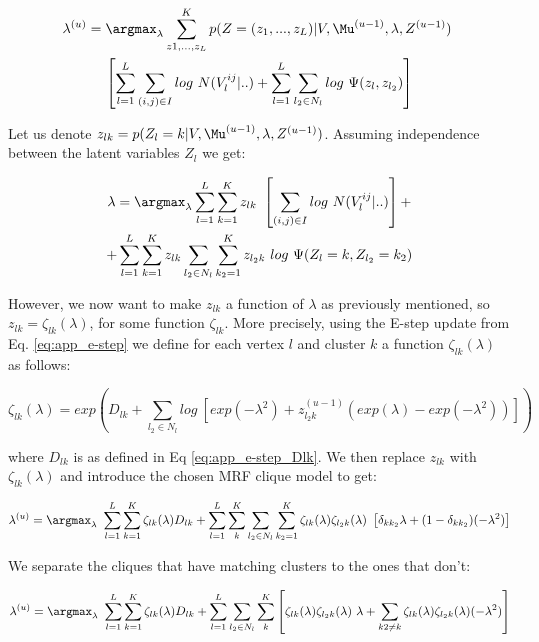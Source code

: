 \begin{multline}
\lambda^{(u)} = \argmax_{\lambda} \sum_{z1,\dots, z_L}^K p(Z = (z_1, ..., z_L) | V, \Mu^{(u-1)}, \lambda, Z^{(u-1)})\ \\ \left[ \sum_{l=1}^L \sum_{(i,j) \in I} log\ N(V_l^{ij} | ..) + \sum_{l = 1}^{L}\sum_{l_2 \in N_l} log\ \Psi (z_{l}, z_{l_2}) \right]
\end{multline}

Let us denote $z_{lk} = p(Z_l = k | V, \Mu^{(u-1)}, \lambda, Z^{(u-1)})$. Assuming independence between the latent variables $Z_l$ we get:

\begin{multline}
\lambda = \argmax_{\lambda} \sum_{l=1}^L \sum_{k=1}^K z_{lk}\ \left[ \sum_{(i,j) \in I} log\ N(V_l^{ij} | ..) \right] + \\ + \sum_{l = 1}^{L} \sum_{k=1}^K z_{lk} \sum_{l_2 \in N_l} \sum_{k_2 = 1}^K z_{l_2k}\ log\ \Psi (Z_{l} = k, Z_{l_2} = k_2)  
\end{multline}

However, we now want to make $z_{lk}$ a function of $\lambda$ as previously mentioned, so $z_{lk}=\zeta_{lk}(\lambda)$, for some function $\zeta_{lk}$. More precisely, using the E-step update from Eq. \ref{eq:app_e-step} we define for each vertex $l$ and cluster $k$ a function $\zeta_{lk}(\lambda)$ as follows:

\begin{equation}
\zeta_{lk}(\lambda) = exp \left( D_{lk} +   \sum_{l_2 \in N_l} log\ \left[ exp(-\lambda^2) + z_{l_2k}^{(u-1)} (exp(\lambda) - exp(-\lambda^2)) \right] \right)
\end{equation}

where $D_{lk}$ is as defined in Eq \ref{eq:app_e-step_Dlk}. We then replace $z_{lk}$ with $\zeta_{lk}(\lambda)$ and introduce the chosen MRF clique model to get:

\begin{equation}
\lambda^{(u)} = \argmax_{\lambda}\ \sum_{l=1}^L \sum_{k=1}^K \zeta_{lk}(\lambda) D_{lk}  + \sum_{l = 1}^{L} \sum_{k}^K \sum_{l_2 \in N_l} \sum_{k_2 = 1}^K \zeta_{lk}(\lambda) \zeta_{l_2k}(\lambda)\ \left[ \delta_{kk_2} \lambda + (1-\delta_{kk_2}) (-\lambda^2)\right]
\end{equation}

We separate the cliques that have matching clusters to the ones that don't:

\begin{equation}
\lambda^{(u)} = \argmax_{\lambda}\ \sum_{l=1}^L \sum_{k=1}^K \zeta_{lk}(\lambda) D_{lk} + \sum_{l = 1}^{L} \sum_{l_2 \in N_l} \sum_{k}^K  \left[ \zeta_{lk}(\lambda) \zeta_{l_2k}(\lambda)\ \lambda + \sum_{k2 \neq k} \zeta_{lk}(\lambda) \zeta_{l_2k}(\lambda) (-\lambda^2)\right]
\end{equation}


